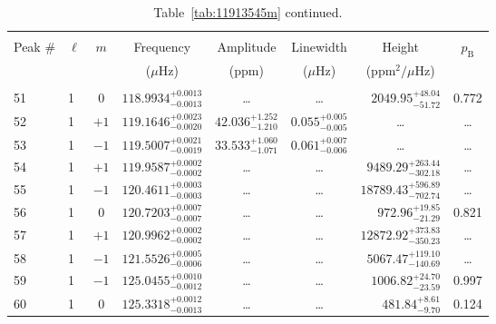 \begin{table*}[!]
\caption{Table~\ref{tab:11913545m} continued.}
\label{tab:11913545m2}
\centering
\begin{tabular}{llcrrlrc}
\hline\hline
\\[-8pt]          
Peak \# & $\ell$ & $m$ & \multicolumn{1}{c}{Frequency} & \multicolumn{1}{c}{Amplitude} & \multicolumn{1}{c}{Linewidth} & \multicolumn{1}{c}{Height}& $p_\mathrm{B}$\\
 & & & \multicolumn{1}{c}{($\mu$Hz)} & \multicolumn{1}{c}{(ppm)} & \multicolumn{1}{c}{($\mu$Hz)} & \multicolumn{1}{c}{(ppm$^2/\mu$Hz)}\\
\hline \\[-8pt]
51 & 1 & 0 & $    118.9934_{-      0.0013}^{+      0.0013}$ & \multicolumn{1}{c}{\dots} & \multicolumn{1}{c}{\dots} & $     2049.95_{-       51.72}^{+       48.04}$ & 0.772\\[1pt]
52 & 1 & $+1$ & $    119.1646_{-      0.0020}^{+      0.0023}$ & $      42.036_{-       1.210}^{+       1.252}$ & $       0.055_{-       0.005}^{+       0.005}$ & \multicolumn{1}{c}{\dots} & \dots \\[1pt]
53 & 1 & $-1$ & $    119.5007_{-      0.0019}^{+      0.0021}$ & $      33.533_{-       1.071}^{+       1.060}$ & $       0.061_{-       0.006}^{+       0.007}$ & \multicolumn{1}{c}{\dots} & \dots \\[1pt]
54 & 1 & $+1$ & $    119.9587_{-      0.0002}^{+      0.0002}$ & \multicolumn{1}{c}{\dots} & \multicolumn{1}{c}{\dots} & $     9489.29_{-      302.18}^{+      263.44}$ & \dots \\[1pt]
55 & 1 & $-1$ & $    120.4611_{-      0.0003}^{+      0.0003}$ & \multicolumn{1}{c}{\dots} & \multicolumn{1}{c}{\dots} & $    18789.43_{-      702.74}^{+      596.89}$ & \dots \\[1pt]
56 & 1 & 0 & $    120.7203_{-      0.0007}^{+      0.0007}$ & \multicolumn{1}{c}{\dots} & \multicolumn{1}{c}{\dots} & $      972.96_{-       21.29}^{+       19.85}$ & 0.821 \\[1pt]
57 & 1 & $+1$ & $    120.9962_{-      0.0002}^{+      0.0002}$ & \multicolumn{1}{c}{\dots} & \multicolumn{1}{c}{\dots} & $    12872.92_{-      350.23}^{+      373.83}$ & \dots \\[1pt]
58 & 1 & $-1$ & $    121.5526_{-      0.0006}^{+      0.0005}$ & \multicolumn{1}{c}{\dots} & \multicolumn{1}{c}{\dots} & $     5067.47_{-      140.69}^{+      119.10}$ & \dots \\[1pt]
59 & 1 & $-1$ & $    125.0455_{-      0.0012}^{+      0.0010}$ & \multicolumn{1}{c}{\dots} & \multicolumn{1}{c}{\dots} & $     1006.82_{-       23.59}^{+       24.70}$ & 0.997\\[1pt]
60 & 1 & 0 & $    125.3318_{-      0.0013}^{+      0.0012}$ & \multicolumn{1}{c}{\dots} & \multicolumn{1}{c}{\dots} & $      481.84_{-        9.70}^{+        8.61}$ & 0.124 \\[1pt]


\end{tabular}
\end{table*}
